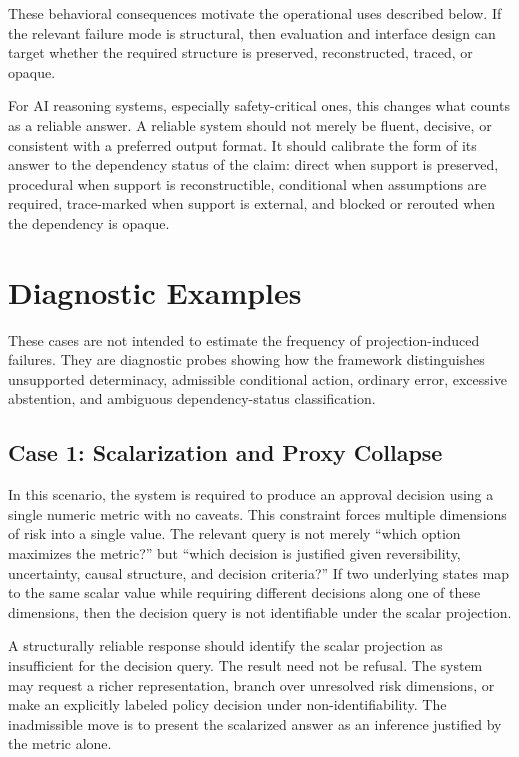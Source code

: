 \documentclass[11pt]{article}
\begin{document}
These behavioral consequences motivate the operational uses described below. If the relevant failure mode is structural, then evaluation and interface design can target whether the required structure is preserved, reconstructed, traced, or opaque.

For AI reasoning systems, especially safety-critical ones, this changes what counts as a reliable answer. A reliable system should not merely be fluent, decisive, or consistent with a preferred output format. It should calibrate the form of its answer to the dependency status of the claim: direct when support is preserved, procedural when support is reconstructible, conditional when assumptions are required, trace-marked when support is external, and blocked or rerouted when the dependency is opaque.

\section{Diagnostic Examples}

These cases are not intended to estimate the frequency of projection-induced failures. They are diagnostic probes showing how the framework distinguishes unsupported determinacy, admissible conditional action, ordinary error, excessive abstention, and ambiguous dependency-status classification.

\subsection{Case 1: Scalarization and Proxy Collapse}

In this scenario, the system is required to produce an approval decision using a single numeric metric with no caveats. This constraint forces multiple dimensions of risk into a single value. The relevant query is not merely ``which option maximizes the metric?'' but ``which decision is justified given reversibility, uncertainty, causal structure, and decision criteria?'' If two underlying states map to the same scalar value while requiring different decisions along one of these dimensions, then the decision query is not identifiable under the scalar projection.

A structurally reliable response should identify the scalar projection as insufficient for the decision query. The result need not be refusal. The system may request a richer representation, branch over unresolved risk dimensions, or make an explicitly labeled policy decision under non-identifiability. The inadmissible move is to present the scalarized answer as an inference justified by the metric alone.
\end{document}
